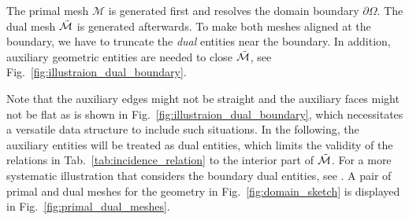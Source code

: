 \documentclass{article}
\begin{document}
The primal mesh $\mathcal{M}$ is generated first and resolves the domain boundary
$\partial\Omega$. The dual mesh $\Tilde{\mathcal{M}}$ is generated afterwards. To make
both meshes aligned at the boundary, we have to truncate the \emph{dual} entities near the
boundary. In addition, auxiliary geometric entities are needed to close
$\Tilde{\mathcal{M}}$, see Fig.~\ref{fig:illustraion_dual_boundary}.

Note that the auxiliary edges might not be straight and the auxiliary faces might not be
flat as is shown in Fig.~\ref{fig:illustraion_dual_boundary}, which necessitates a
versatile data structure to include such situations. In the following, the auxiliary
entities will be treated as dual entities, which limits the validity of the relations in
Tab.~\ref{tab:incidence_relation} to the interior part of $\Tilde{\mathcal{M}}$. For a more
systematic illustration that considers the boundary dual entities, see
\cite[][Sec.~5]{hip_1999}. A pair of primal and dual meshes for the geometry in Fig.~\ref{fig:domain_sketch} is displayed in Fig.~\ref{fig:primal_dual_meshes}.
\end{document}
